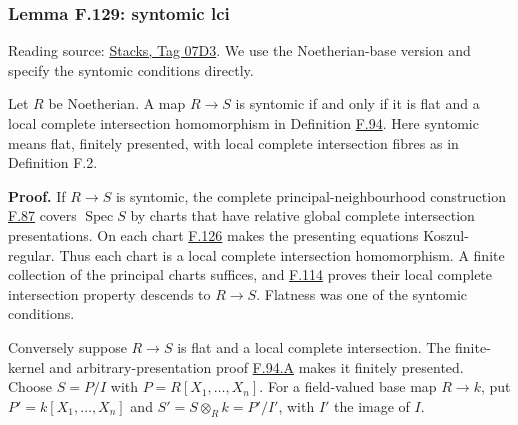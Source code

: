 \documentclass[11pt,a4paper,openany]{report}
\begin{document}
\label{AG-RG-S05-more-algebra-lemma-syntomic-lci}

\subsubsection{Lemma F.129: syntomic lci}\label{AG-RG-S05-lemma-f.129-syntomic-lci}

Reading source: \href{https://stacks.math.columbia.edu/tag/07D3}{Stacks, Tag 07D3}. We use the Noetherian-base version and specify the syntomic conditions directly.

Let \(R\) be Noetherian. A map \(R\to S\) is syntomic if and only if it is flat and a local complete intersection homomorphism in Definition \hyperref[AG-RG-S05-more-algebra-definition-local-complete-intersection]{F.94}. Here syntomic means flat, finitely presented, with local complete intersection fibres as in Definition F.2.

\textbf{Proof.} If \(R\to S\) is syntomic, the complete principal-neighbourhood construction \hyperref[AG-RG-S05-algebra-lemma-syntomic]{F.87} covers \(\operatorname{Spec}S\) by charts that have relative global complete intersection presentations. On each chart \hyperref[AG-RG-S05-more-algebra-lemma-relative-global-complete-intersection-koszul]{F.126} makes the presenting equations Koszul-regular. Thus each chart is a local complete intersection homomorphism. A finite collection of the principal charts suffices, and \hyperref[AG-RG-S05-more-algebra-lemma-lci-local]{F.114} proves their local complete intersection property descends to \(R\to S\). Flatness was one of the syntomic conditions.

Conversely suppose \(R\to S\) is flat and a local complete intersection. The finite-kernel and arbitrary-presentation proof \hyperref[AG-RG-S05-more-algebra-lemma-lci-presentation-independent]{F.94.A} makes it finitely presented. Choose \(S=P/I\) with \(P=R[X_1,\ldots,X_n]\). For a field-valued base map \(R\to k\), put \(P'=k[X_1,\ldots,X_n]\) and \(S'=S\otimes_R k=P'/I'\), with \(I'\) the image of \(I\).
\end{document}

